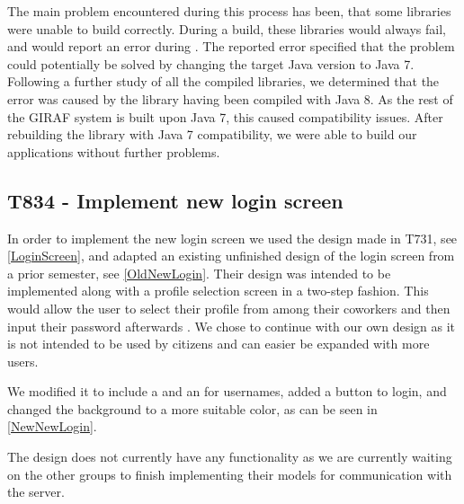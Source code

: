 The main problem encountered during this process has been, that some libraries
were unable to build correctly. During a build, these libraries would always
fail, and would report an error during
. The reported error specified
that the problem could potentially be solved by changing the target Java version
to Java 7. Following a further study of all the compiled libraries, we determined
that the error was caused by the  library having been
compiled with Java 8. As the rest of the GIRAF system is built upon Java 7, this caused
compatibility issues. After rebuilding the library with Java 7 compatibility, we
were able to build our applications without further problems.

\subsection{T834 - Implement new login screen}\label{LoginXML}
In order to implement the new login screen we used the design made in T731,
see \autoref{LoginScreen}, and adapted an existing unfinished design of
the login screen from a prior semester, see \autoref{OldNewLogin}. Their design
was intended to be implemented along with a profile selection screen in
a two-step fashion. This would allow the user to select their profile from
among their coworkers and then input their password afterwards \citep[Ch.9.5,
p.68-70]{RestLogin}. We chose to continue with our own design as it is
not intended to be used by citizens and can easier be expanded with more users.


We modified it to include a  and an  for
usernames, added a button to login, and changed the background to a more
suitable color, as can be seen in \autoref{NewNewLogin}.


The design does not currently have any functionality as we are currently waiting
on the other groups to finish implementing their models for communication with
the server.

